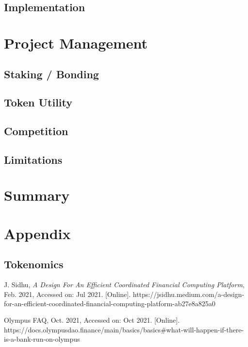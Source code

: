 \documentclass{article}
\begin{document}
\lipsum[1-1]


\subsection{Implementation}

\lipsum[1-1]

\section{Project Management}

\subsection{Staking / Bonding}

\lipsum[1-1]

\subsection{Token Utility}

\lipsum[1-1]


\subsection{Competition}

\lipsum[1-1]

\subsection{Limitations}

\lipsum[1-1]

\section{Summary}

\lipsum[1-1]

\section{Appendix}

\subsection{Tokenomics}
\label{section:tokenomics}

\lipsum[1-1]

\begin{thebibliography}{1}



 J. Sidhu, \textit{A Design For An Efficient Coordinated Financial Computing Platform}, Feb. 2021, Accessed on: Jul 2021. [Online]. https://jsidhu.medium.com/a-design-for-an-efficient-coordinated-financial-computing-platform-ab27e8a825a0


 Olympus FAQ, Oct. 2021, Accessed on: Oct 2021. [Online]. https://docs.olympusdao.finance/main/basics/basics\#what-will-happen-if-there-is-a-bank-run-on-olympus




\end{thebibliography}
\end{document}
